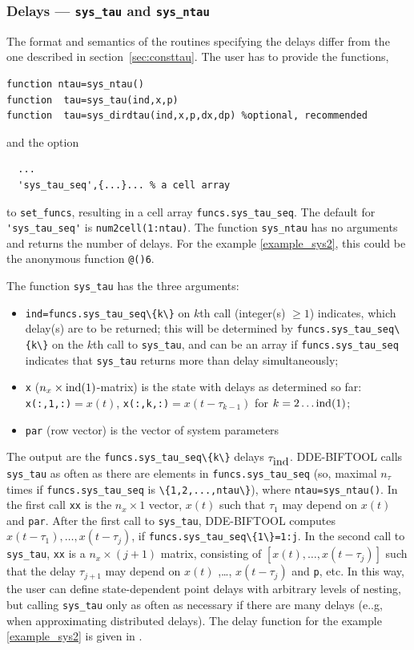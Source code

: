 \documentclass[10pt]{scrartcl}
\newcommand{\DDEBIFCODE}{\textsc{DDE-BIFTOOL}}
\newcommand{\blist}[1]{\mbox{\lstinline!#1!}}
\begin{document}
\subsubsection{Delays --- \texorpdfstring{\blist{sys_tau}}{sys\_tau} and \texorpdfstring{\blist{sys_ntau}}{sys\_ntau}}
\label{sec:sdtau}
The format and semantics of the routines specifying the delays differ
from the one described in section~\ref{sec:consttau}. The user has to provide the functions,
\begin{lstlisting}
function ntau=sys_ntau()        
function  tau=sys_tau(ind,x,p)
function  tau=sys_dirdtau(ind,x,p,dx,dp) %optional, recommended
\end{lstlisting}
and the option
\begin{lstlisting}
  ...
  'sys_tau_seq',{...}... % a cell array
\end{lstlisting}
to \blist{set_funcs}, resulting in a cell array \blist{funcs.sys_tau_seq}. The default for
\blist{'sys_tau_seq'} is \blist{num2cell(1:ntau)}.  The function
\blist{sys_ntau} has no arguments and returns the number of delays. For the example \eqref{example_sys2},
this could be the anonymous function \blist{@()6}.

The function \blist{sys_tau} has the three arguments:
\begin{itemize}
\item \blist{ind=funcs.sys_tau_seq\{k\}} on $k$th call (integer(s)
  $\geq1$) indicates, which delay(s) are to be returned; this will be
  determined by \blist{funcs.sys_tau_seq\{k\}} on the $k$th call to
  \blist{sys_tau}, and can be an array if \blist{funcs.sys_tau_seq}
  indicates that \blist{sys_tau} returns more than delay
  simultaneously;
\item \blist{x} ($ n_x\times\blist{ind(1)}$-matrix) is the state with delays as determined so far:
  \blist{x(:,1,:)}$=x(t)$, \blist{x(:,k,:)}$=x(t-\tau_{k-1})$ for
  $k=2\ldots\blist{ind(1)}$;
\item \blist{par} (row vector) is the vector of system parameters
\end{itemize}
The output are the \blist{funcs.sys_tau_seq\{k\}} delays
$\tau_{\blist{ind}}$. \DDEBIFCODE{} calls \blist{sys_tau} as often as
there are elements in \blist{funcs.sys_tau_seq} (so, maximal $n_\tau$
times if \blist{funcs.sys_tau_seq} is \blist{\{1,2,...,ntau\}}), where
\blist{ntau=sys_ntau()}. In the first call \blist{xx} is the
$n_x\times1$ vector, $x(t)$ such that $\tau_1$ may depend on $x(t)$
and \blist{par}. After the first call to \blist{sys_tau},
\DDEBIFCODE{} computes $x(t-\tau_1),\ldots,x(t-\tau_j)$, if
\blist{funcs.sys_tau_seq\{1\}=1:j}. In the second call to
\blist{sys_tau}, \blist{xx} is a $n_x\times(j+1)$ matrix, consisting
of $[x(t),\ldots,x(t-\tau_j)]$ such that the delay $\tau_{j+1}$ may
depend on $x(t)$ ,\ldots, $x(t-\tau_j)$ and \blist{p}, etc. In this
way, the user can define state-dependent point delays with arbitrary
levels of nesting, but calling \blist{sys_tau} only as often as
necessary if there are many delays (e..g, when approximating
distributed delays). The delay function for the example
\eqref{example_sys2} is given in .
\end{document}
